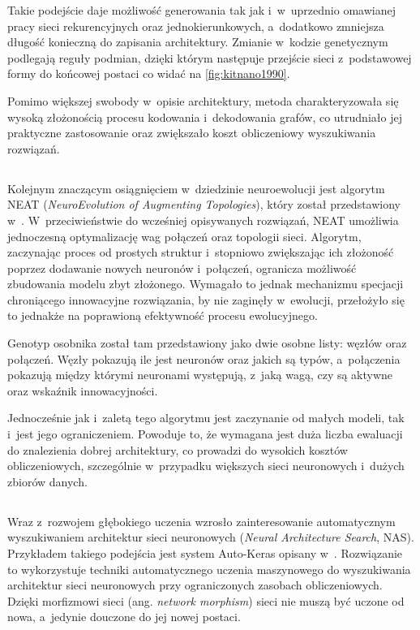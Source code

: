 Takie podejście daje możliwość generowania
tak jak i~w~uprzednio omawianej pracy sieci
rekurencyjnych oraz jednokierunkowych,
a~dodatkowo zmniejsza długość konieczną
do zapisania architektury.
Zmianie w~kodzie genetycznym podlegają reguły podmian,
dzięki którym następuje przejście sieci
z~podstawowej formy do końcowej postaci
co widać na \cref{fig:kitnano1990}.

Pomimo większej swobody w~opisie architektury,
metoda charakteryzowała się wysoką złożonością
procesu kodowania i~dekodowania grafów,
co utrudniało jej praktyczne zastosowanie
oraz zwiększało koszt obliczeniowy
wyszukiwania rozwiązań.

\tocless\subsection{}
Kolejnym znaczącym osiągnięciem w~dziedzinie
neuroewolucji jest algorytm NEAT
(\textit{NeuroEvolution of Augmenting Topologies}),
który został przedstawiony
w~.
W~przeciwieństwie do wcześniej opisywanych rozwiązań,
NEAT umożliwia jednoczesną optymalizację
wag połączeń oraz topologii sieci.
Algorytm, zaczynając proces od prostych struktur
i~stopniowo zwiększając ich złożoność
poprzez dodawanie nowych neuronów i~połączeń,
ogranicza możliwość zbudowania modelu zbyt złożonego.
Wymagało to jednak mechanizmu specjacji
chroniącego innowacyjne rozwiązania,
by nie zaginęły w~ewolucji,
przełożyło się to jednakże
na poprawioną efektywność
procesu ewolucyjnego.

Genotyp osobnika został tam przedstawiony
jako dwie osobne listy: węzłów oraz połączeń.
Węzły pokazują ile jest neuronów oraz jakich są typów,
a~połączenia pokazują między którymi
neuronami występują, z~jaką wagą,
czy są aktywne oraz wskaźnik innowacyjności.

Jednocześnie jak i~zaletą tego algorytmu
jest zaczynanie od małych modeli,
tak i~jest jego ograniczeniem.
Powoduje to, że wymagana jest duża liczba
ewaluacji do znalezienia dobrej architektury,
co prowadzi do wysokich kosztów obliczeniowych,
szczególnie w~przypadku większych sieci neuronowych
i~dużych zbiorów danych.

\tocless\subsection{}
Wraz z~rozwojem głębokiego uczenia wzrosło
zainteresowanie automatycznym wyszukiwaniem
architektur sieci neuronowych
(\textit{Neural Architecture Search}, NAS).
Przykładem takiego podejścia jest system
Auto-Keras opisany w~.
Rozwiązanie to wykorzystuje techniki
automatycznego uczenia maszynowego
do wyszukiwania architektur sieci neuronowych
przy ograniczonych zasobach obliczeniowych.
Dzięki morfizmowi sieci
(ang. \textit{network morphism})
sieci nie muszą być uczone od nowa,
a~jedynie douczone do jej nowej postaci.

